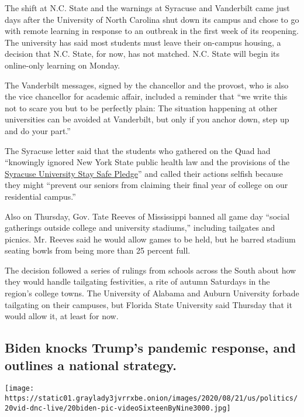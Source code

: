 The shift at N.C. State and the warnings at Syracuse and Vanderbilt came
just days after the University of North Carolina shut down its campus
and chose to go with remote learning in response to an outbreak in the
first week of its reopening. The university has said most students must
leave their on-campus housing, a decision that N.C. State, for now, has
not matched. N.C. State will begin its online-only learning on Monday.

The Vanderbilt messages, signed by the chancellor and the provost, who
is also the vice chancellor for academic affair, included a reminder
that ``we write this not to scare you but to be perfectly plain: The
situation happening at other universities can be avoided at Vanderbilt,
but only if you anchor down, step up and do your part.''

The Syracuse letter said that the students who gathered on the Quad had
``knowingly ignored New York State public health law and the provisions
of the
\href{https://www.syracuse.edu/fall2020/stay-safe-pledge/}{Syracuse
University Stay Safe Pledge}'' and called their actions selfish because
they might ``prevent our seniors from claiming their final year of
college on our residential campus.''

Also on Thursday, Gov. Tate Reeves of Mississippi banned all game day
``social gatherings outside college and university stadiums,'' including
tailgates and picnics. Mr. Reeves said he would allow games to be held,
but he barred stadium seating bowls from being more than 25 percent
full.

The decision followed a series of rulings from schools across the South
about how they would handle tailgating festivities, a rite of autumn
Saturdays in the region's college towns. The University of Alabama and
Auburn University forbade tailgating on their campuses, but Florida
State University said Thursday that it would allow it, at least for now.

\hypertarget{biden-knocks-trumps-pandemic-response-and-outlines-a-national-strategy}{%
\subsection{Biden knocks Trump's pandemic response, and outlines a
national
strategy.}\label{biden-knocks-trumps-pandemic-response-and-outlines-a-national-strategy}}

\texttt{[image: https://static01.graylady3jvrrxbe.onion/images/2020/08/21/us/politics/20vid-dnc-live/20biden-pic-videoSixteenByNine3000.jpg]}

